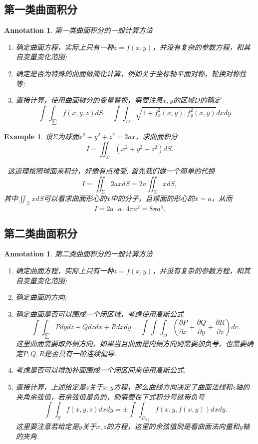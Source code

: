 \documentclass{article}
\newtheorem{example}[theorem]{Example}
\newtheorem{annotation}[theorem]{Annotation}
\newcommand{\hints}{{\color{blue} \text{hints}}}
\begin{document}
\subsection{第一类曲面积分}

\begin{annotation}
\rm 第一类曲面积分的一般计算方法
\begin{enumerate}
	\item 确定曲面方程，实际上只有一种$z=f(x,y)$，并没有复杂的参数方程，和其自变量变化范围; 
	\item 确定是否为特殊的曲面做简化计算，例如关于坐标轴平面对称，轮换对称性等;
	\item 直接计算，使用曲面微分的变量替换，需要注意$x,y$的区域$D$的确定
	$$
\int\int_\sum f(x,y,z)dS = \int\int_D\sqrt{1+f_x^2(x,y),f_y^2(x,y)}dxdy.
$$
\end{enumerate}
\end{annotation}

\begin{example}
\rm 设$\Sigma$为球面$x^2 + y^2 + z^2 = 2ax$，求曲面积分
$$
I =\iint_{\Sigma} (x^2 + y^2 + z^2)dS.
$$

\hints\ 这道理按照球面来积分，好像有点难受. 首先我们做一个简单的代换
$$
I = \iint_{\Sigma} 2ax dS = 2a \iint_{\Sigma} xdS,
$$
其中$\iint_{\Sigma} xdS$可以看求曲面形心的$\bar{x}$中的分子，且球面的形心的$\bar{x} = a$，从而
$$
I = 2a \cdot a \cdot 4\pi a^2 = 8\pi a^4. 
$$
\end{example}

\subsection{第二类曲面积分}

\begin{annotation}
\rm 第二类曲面积分的一般计算方法
\begin{enumerate}
	\item 确定曲面方程，实际上只有一种$z=f(x,y)$，并没有复杂的参数方程，和其自变量变化范围; 
	\item 确定曲面的方向;
	\item 确定曲面是否可以围成一个闭区域，考虑使用高斯公式
	$$
	\int\int_\sum Pdydz + Qdzdx + Rdxdy = \int\int\int_\Omega (\frac{\partial P}{\partial x}+\frac{\partial Q}{\partial y}+\frac{\partial R}{\partial z})dv.
	$$
	这里曲面需要取外侧方向，如果当且曲面是内侧方向则需要加负号，也需要确定$P,Q,R$是否具有一阶连续偏导. 
	\item 考虑是否可以增加补面围成一个闭区间来使用高斯公式. 
	\item 直接计算，上述给定是$z$关于$x,y$方程，那么曲线方向决定了曲面法线和$z$轴的夹角余弦值，若余弦值是负的，则需要在下式积分号就带负号
	$$
	\int\int_{S} f(x,y,z)dxdy = \pm \int\int_{D_{xy}} f(x,y,f(x,y))dxdy.
	$$
	这里要注意若给定是$y$关于$x,z$的方程，这里的余弦值则是看曲面法向量和$y$轴的夹角. 
\end{enumerate}
\end{annotation}
\end{document}
